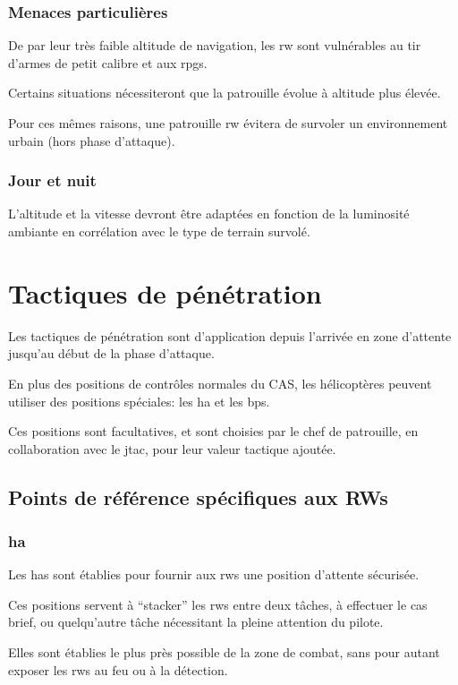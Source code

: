 \subsubsection{Menaces particulières}

\e
    \item De par leur très faible altitude de navigation, les \gls{rw} sont vulnérables au tir d’armes de petit calibre et aux \glspl{rpg}.
    \item Certains situations nécessiteront que la patrouille évolue à altitude plus élevée.
    \item Pour ces mêmes raisons, une patrouille \gls{rw} évitera de survoler un environnement urbain (hors phase d’attaque).
\ed

\subsubsection{Jour et nuit}

\e
    \item L’altitude et la vitesse devront être adaptées en fonction de la luminosité ambiante en corrélation avec le type de terrain survolé.
\ed

\section{Tactiques de pénétration}

\e
    \item Les tactiques de pénétration sont d’application depuis l’arrivée en zone d’attente jusqu’au début de la phase d’attaque.
    \item En plus des positions de contrôles normales du CAS, les hélicoptères peuvent utiliser des positions spéciales: les \gls{ha} et les \glspl{bp}.
    \item Ces positions sont facultatives, et sont choisies par le chef de patrouille, en collaboration avec le \gls{jtac}, pour leur valeur tactique ajoutée.
\ed

\subsection{Points de référence spécifiques aux RWs}

\subsubsection{\acrfull{ha}}

\e
    \item Les \glspl{ha} sont établies pour fournir aux \glspl{rw} une position d’attente sécurisée.
    \item Ces positions servent à “stacker” les \glspl{rw} entre deux tâches, à effectuer le \gls{cas} brief, ou quelqu’autre tâche nécessitant la pleine attention du pilote.
    \item Elles sont établies le plus près possible de la zone de combat, sans pour autant exposer les \glspl{rw} au feu ou à la détection.
\ed

